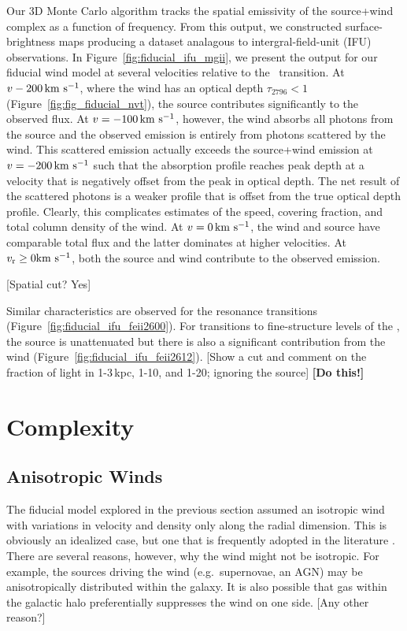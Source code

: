 \documentclass[12pt,preprint]{aastex}
\begin{document}
Our 3D Monte Carlo algorithm tracks the spatial emissivity of the source+wind
complex as a function of frequency.  From this output, we
constructed surface-brightness maps producing a
dataset analagous to intergral-field-unit (IFU) observations.  In
Figure~\ref{fig:fiducial_ifu_mgii}, we present the output for our
fiducial wind model at several velocities relative to the \mgiia\
transition. At $v -200 \, {\rm km~s^{-1}}$, where the wind has an optical
depth $\tau_{2796} < 1$ (Figure~\ref{fig:fig_fiducial_nvt}),
the source contributes significantly to the observed flux.  
At $v=-100 \, {\rm km~s^{-1}}$, however, the
wind absorbs all photons from the source and the observed emission is
entirely from photons scattered by the wind.  This scattered emission
actually exceeds the source+wind emission at 
$v = -200 \, {\rm km~s^{-1}}$ such
that the absorption profile reaches peak depth at a velocity that is
negatively offset from
the peak in optical depth.  The net result of the scattered photons is
a weaker \ion{Mg}{2} profile that is offset from the true optical
depth profile.  Clearly, this complicates estimates of the
speed, covering fraction, and total column density of the wind.  At $v
= 0 \, {\rm km~s^{-1}}$, the wind and source have comparable total flux and the
latter dominates at higher velocities.  
At $v_{\rm r} \ge 0
{\rm km~s^{-1}}$,  both the source and wind contribute to the observed emission.

[Spatial cut? Yes]

Similar characteristics are observed for the  resonance
transitions (Figure~\ref{fig:fiducial_ifu_feii2600}).
For transitions to fine-structure levels of the \aconfig, the source
is unattenuated but there is also a significant contribution from the
wind (Figure~\ref{fig:fiducial_ifu_feii2612}).
[Show a cut and comment on the fraction of light in 1-3\,kpc, 1-10,
and 1-20; ignoring the source] {\bf [Do this!]}

\section{Complexity}

\subsection{Anisotropic Winds}
\label{sec:anisotropic}

The fiducial model explored in the previous section assumed an
isotropic wind with variations in velocity and density only
along the radial dimension.  This is obviously an idealized case, but
one that is frequently adopted in the literature
\citep[e.g.][]{steidel+10}.   There are several reasons, however, why
the wind might not be isotropic.  For example, the sources driving the
wind (e.g.\ supernovae, an AGN) may be anisotropically distributed
within the galaxy.  It is also possible that gas within the galactic
halo preferentially suppresses the wind on one side.  [Any other
reason?]
\end{document}
